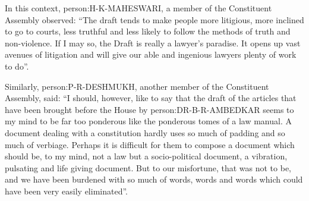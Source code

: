 \begin{multicol}{2}
In this context, \gls{person:H-K-MAHESWARI}, a member of the Constituent Assembly observed: ``The draft tends to make people more litigious, more inclined to go to courts, less truthful and less likely to follow the methods of truth and non-violence. If I may so, the Draft is really a lawyer's paradise. It opens up vast avenues of litigation and will give our able and ingenious lawyers plenty of work to do''.

Similarly, \gls{person:P-R-DESHMUKH}, another member of the Constituent Assembly, said: ``I should, however, like to say that the draft of the articles that have been brought before the House by \gls{person:DR-B-R-AMBEDKAR} seems to my mind to be far too ponderous like the ponderous tomes of a law manual. A document dealing with a constitution hardly uses so much of padding and so much of verbiage. Perhaps it is difficult for them to compose a document which should be, to my mind, not a law but a socio-political document, a vibration, pulsating and life giving document. But to our misfortune, that was not to be, and we have been burdened with so much of words, words and words which could have been very easily eliminated''.

\clearpage


\end{multicol}
